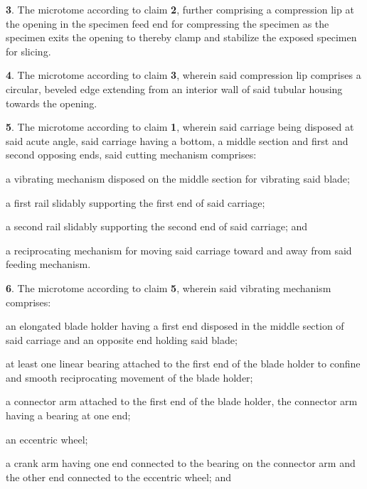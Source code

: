 \documentclass{article}
\begin{document}
\begin{hangpars}
\textbf{3}. The microtome according to claim \textbf{2}, further comprising a compression lip at the opening in the specimen feed end for compressing the specimen as the specimen exits the opening to thereby clamp and stabilize the exposed specimen for slicing.

\textbf{4}. The microtome according to claim \textbf{3}, wherein said compression lip comprises a circular, beveled edge extending from an interior wall of said tubular housing towards the opening.

\textbf{5}. The microtome according to claim \textbf{1}, wherein said carriage being disposed at said acute angle, said carriage having a bottom, a middle section and first and second opposing ends, said cutting mechanism comprises:

\hspace*{1.5em}a vibrating mechanism disposed on the middle section for vibrating said blade;

\hspace*{1.5em}a first rail slidably supporting the first end of said carriage;

\hspace*{1.5em}a second rail slidably supporting the second end of said carriage; and

\hspace*{1.5em}a reciprocating mechanism for moving said carriage toward and away from said feeding mechanism.

\textbf{6}. The microtome according to claim \textbf{5}, wherein said vibrating mechanism comprises:

\hspace*{1.5em}an elongated blade holder having a first end disposed in the middle section of said carriage and an opposite end holding said blade;

\hspace*{1.5em}at least one linear bearing attached to the first end of the blade holder to confine and smooth reciprocating movement of the blade holder;

\hspace*{1.5em}a connector arm attached to the first end of the blade holder, the connector arm having a bearing at one end;

\hspace*{1.5em}an eccentric wheel;

\hspace*{1.5em}a crank arm having one end connected to the bearing on the connector arm and the other end connected to the eccentric wheel; and


\end{hangpars}
\end{document}
